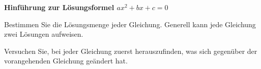 



\usepackage{amssymb} 
\renewcommand{\metaHeaderLine}{Arbeitsblatt}
\renewcommand{\arbeitsblattTitel}{Einführung zur quadratischen Ergänzung}

\arbeitsblattHeader{}

\textbf{Hinführung zur Lösungsformel $ax^2+bx+c=0$}

Bestimmen Sie die Lösungsmenge jeder Gleichung. Generell kann jede Gleichung zwei Lösungen aufweisen.

Versuchen Sie, bei jeder Gleichung zuerst herauszufinden, was sich gegenüber der vorangehenden Gleichung geändert hat.

\newcommand{\noteSpace}{\noTRAINER{\mmPapier{4}}}

\newcommand{\quadGleichung}[4]{
\TRAINER{\hrulefill\\}%
\par
\needspace{4\baselineskip}
\begin{samepage}
\stepcounter{nuemmerli}(\thenuemmerli. )\,\,\,\, #1\\
\noTRAINER{\mmPapier{#2}}\TRAINER{{\color{black}#3}
{(Vorgehen: \color{blue}#4})}\\
\end{samepage}

}%

